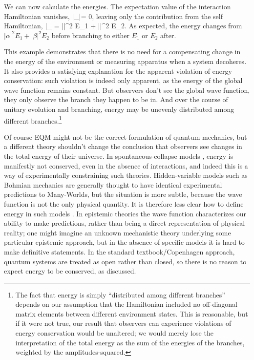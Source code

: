 \documentclass[12pt,aps,prd,onecolumn,nofootinbib,notitlepage]{revtex4-1}
\begin{document}
We can now calculate the energies.
The expectation value of the interaction Hamiltonian vanishes,
\be
  \langle\psi |\ham_|\psi\rangle = 0,
\ee
leaving only the contribution from the self Hamiltonian,
\be
  \langle\psi |\ham_|\psi\rangle = |\alpha|^2 E_1 + |\beta|^2 E_2.
\ee
As expected, the energy changes from $|\alpha|^2 E_1 + |\beta|^2 E_2$ before branching to either $E_1$ or $E_2$ after.

This example demonstrates that there is no need for a compensating change in the energy of the environment or measuring apparatus when a system decoheres.
It also provides a satisfying explanation for the apparent violation of energy conservation: such violation is indeed only apparent, as the energy of the global wave function remains constant.
But observers don't see the global wave function, they only observe the branch they happen to be in.
And over the course of unitary evolution and branching, energy may be unevenly distributed among different branches.\footnote{The fact that energy is simply ``distributed among different branches'' depends on our assumption that the Hamiltonian included no off-diagonal matrix elements between different environment states. This is reasonable, but if it were not true, our result that observers can experience violations of energy conservation would be unaltered; we would merely lose the interpretation of the total energy as the sum of the energies of the branches, weighted by the amplitudes-squared.}

Of course EQM might not be the correct formulation of quantum mechanics, but a different theory shouldn't change the conclusion that observers see changes in the total energy of their universe.
In spontaneous-collapse models \cite{Ghirardi:1985mt,Pearle:1988uh,Ghirardi:1989cn}, energy is manifestly not conserved, even in the absence of interactions, and indeed this is a way of experimentally constraining such theories.
Hidden-variable models such as Bohmian mechanics \cite{duerr2009bohmian} are generally thought to have identical experimental predictions to Many-Worlds, but the situation is more subtle, because the wave function is not the only physical quantity.
It is therefore less clear how to define energy in such models \cite{Maudlin:2019bje}.
In epistemic theories \cite{leifer2014quantum} the wave function characterizes our ability to make predictions, rather than being a direct representation of physical reality; one might imagine an unknown mechanistic theory underlying some particular epistemic approach, but in the absence of specific models it is hard to make definitive statements.
In the standard textbook/Copenhagen approach, quantum systems are treated as open rather than closed, so there is no reason to expect energy to be conserved, as discussed.
\end{document}
